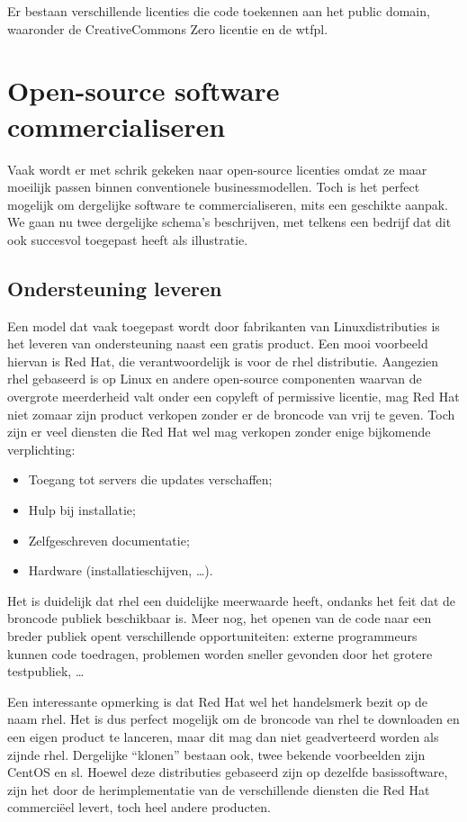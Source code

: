 Er bestaan verschillende licenties die code toekennen aan het public domain, waaronder de CreativeCommons Zero licentie en de \ac{wtfpl}.

\section{Open-source software commercialiseren}
\label{ontwerp:licenties:commercialiseren}

Vaak wordt er met schrik gekeken naar open-source licenties omdat ze maar moeilijk passen binnen conventionele businessmodellen. Toch is het perfect mogelijk om dergelijke software te commercialiseren, mits een geschikte aanpak. We gaan nu twee dergelijke schema's beschrijven, met telkens een bedrijf dat dit ook succesvol toegepast heeft als illustratie.

\subsection{Ondersteuning leveren}
\label{ontwerp:licenties:commercialiseren:ondersteuning}

Een model dat vaak toegepast wordt door fabrikanten van Linuxdistributies is het leveren van ondersteuning naast een gratis product. Een mooi voorbeeld hiervan is Red Hat, die verantwoordelijk is voor de \ac{rhel} distributie. Aangezien \ac{rhel} gebaseerd is op Linux en andere open-source componenten waarvan de overgrote meerderheid valt onder een copyleft of permissive licentie, mag Red Hat niet zomaar zijn product verkopen zonder er de broncode van vrij te geven. Toch zijn er veel diensten die Red Hat wel mag verkopen zonder enige bijkomende verplichting:
\begin{itemize}
  \item Toegang tot servers die updates verschaffen;
  \item Hulp bij installatie;
  \item Zelfgeschreven documentatie;
  \item Hardware (installatieschijven, \ldots).
\end{itemize}

Het is duidelijk dat \ac{rhel} een duidelijke meerwaarde heeft, ondanks het feit dat de broncode publiek beschikbaar is. Meer nog, het openen van de code naar een breder publiek opent verschillende opportuniteiten: externe programmeurs kunnen code toedragen, problemen worden sneller gevonden door het grotere testpubliek, \ldots

Een interessante opmerking is dat Red Hat wel het handelsmerk bezit op de naam \acl{rhel}. Het is dus perfect mogelijk om de broncode van \ac{rhel} te downloaden en een eigen product te lanceren, maar dit mag dan niet geadverteerd worden als zijnde \ac{rhel}. Dergelijke ``klonen'' bestaan ook, twee bekende voorbeelden zijn CentOS en \ac{sl}. Hoewel deze distributies gebaseerd zijn op dezelfde basissoftware, zijn het door de herimplementatie van de verschillende diensten die Red Hat commerciëel levert, toch heel andere producten.

